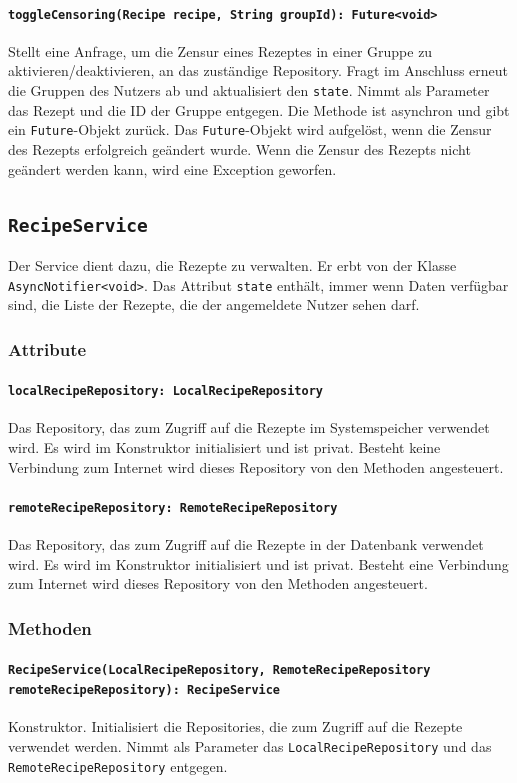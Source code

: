 \documentclass{entwurfsheft}
\begin{document}
\paragraph{\texttt{toggleCensoring(Recipe recipe, String groupId): Future<void>}}
Stellt eine Anfrage, um die Zensur eines Rezeptes in einer Gruppe zu aktivieren/deaktivieren, an das zuständige Repository. Fragt im Anschluss erneut die Gruppen des Nutzers ab und aktualisiert den \texttt{state}. Nimmt als Parameter das Rezept und die ID der Gruppe entgegen. Die Methode ist asynchron und gibt ein \texttt{Future}-Objekt zurück. Das \texttt{Future}-Objekt wird aufgelöst, wenn die Zensur des Rezepts erfolgreich geändert wurde. Wenn die Zensur des Rezepts nicht geändert werden kann, wird eine Exception geworfen.

\newpage
\subsection{\texttt{RecipeService}}\label{sec:RecipeService}
Der Service dient dazu, die Rezepte zu verwalten. Er erbt von der Klasse \texttt{AsyncNotifier<void>}. Das Attribut \texttt{state} enthält, immer wenn Daten verfügbar sind, die Liste der Rezepte, die der angemeldete Nutzer sehen darf.
\subsubsection*{Attribute}
\paragraph{\texttt{localRecipeRepository: LocalRecipeRepository}}
Das Repository, das zum Zugriff auf die Rezepte im Systemspeicher verwendet wird. Es wird im Konstruktor initialisiert und ist privat. Besteht keine Verbindung zum Internet wird dieses Repository von den Methoden angesteuert.
\paragraph{\texttt{remoteRecipeRepository: RemoteRecipeRepository}}
Das Repository, das zum Zugriff auf die Rezepte in der Datenbank verwendet wird. Es wird im Konstruktor initialisiert und ist privat. Besteht eine Verbindung zum Internet wird dieses Repository von den Methoden angesteuert.
\subsubsection*{Methoden}
\paragraph{\texttt{RecipeService(LocalRecipeRepository, RemoteRecipeRepository remoteRecipeRepository): RecipeService\\}}
Konstruktor. Initialisiert die Repositories, die zum Zugriff auf die Rezepte verwendet werden. Nimmt als Parameter das \texttt{LocalRecipeReposi\-tory} und das \texttt{RemoteRecipeRepository} entgegen.
\end{document}
